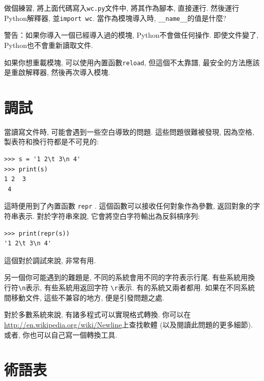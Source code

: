 \documentclass[10pt]{book}
\begin{document}
做個練習, 將上面代碼寫入{\tt wc.py}文件中, 將其作為腳本, 直接運行. 
然後運行Python解釋器, 並{\tt import wc}. 
當作為模塊導入時, \verb"__name__"的值是什麼?

警告：如果你導入一個已經導入過的模塊, Python不會做任何操作. 
即使文件變了, Python也不會重新讀取文件. 

如果你想重載模塊, 可以使用內置函數{\tt reload}, 
但這個不太靠譜, 最安全的方法應該是重啟解釋器, 然後再次導入模塊. 

\section{調試}

當讀寫文件時, 可能會遇到一些空白導致的問題. 
這些問題很難被發現, 因為空格, 製表符和換行符都是不可見的:

\begin{verbatim}
>>> s = '1 2\t 3\n 4'
>>> print(s)
1 2  3
 4
\end{verbatim}

這時便用到了內置函數 {\tt repr} . 
這個函數可以接收任何對象作為參數, 返回對象的字符串表示. 
對於字符串來說, 它會將空白字符輸出為反斜槓序列:

\begin{verbatim}
>>> print(repr(s))
'1 2\t 3\n 4'
\end{verbatim}

這個對於調試來說, 非常有用. 

另一個你可能遇到的難題是, 不同的系統會用不同的字符表示行尾. 
有些系統用換行符\verb"\n"表示, 有些系統用返回字符 \verb"\r"表示. 
有的系統又兩者都用. 
如果在不同系統間移動文件, 這些不兼容的地方, 便是引發問題之處. 

對於多數系統來說, 有諸多程式可以實現格式轉換. 
你可以在\url{http://en.wikipedia.org/wiki/Newline}上查找軟體
(以及閱讀此問題的更多細節). 
或者, 你也可以自己寫一個轉換工具. 


\section{術語表}
\end{document}
